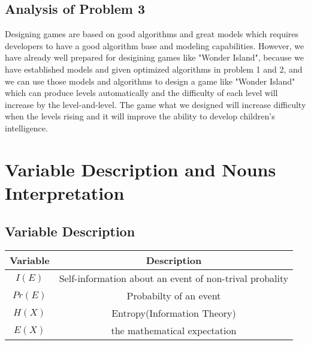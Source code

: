 \documentclass[12pt,a4paper,]{article}
\begin{document}
\subsection{Analysis of Problem 3}
Designing games are based on good algorithms and great models which requires developers to have a good algorithm base and modeling capabilities. However, we have already well prepared for desigining games like "Wonder Island", because we have established models and given optimized algorithms in problem 1 and 2, and we can use those models and algorithms to design a game like "Wonder Island" which can produce levels automatically and the difficulty of each level will increase by the level-and-level. The game what we designed will  increase difficulty when the levels rising and it will  improve the ability to develop children's intelligence.

\section{Variable Description and Nouns Interpretation}

\subsection{Variable Description}
\begin{tabular}{|c|c|}%
\hline  %
Variable&Description\\
\hline  %
$I(E)$ & Self-information about an event of non-trival probality\\
\hline %
$Pr(E)$ & Probabilty of an event\\
\hline
$H(X)$ & Entropy(Information Theory)\\
\hline
$E(X)$ & the mathematical expectation\\
\hline
\end{tabular}
\end{document}
